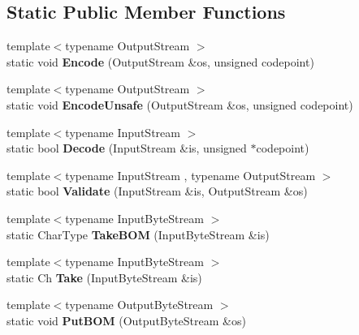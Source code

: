 \subsection*{Static Public Member Functions}
\begin{DoxyCompactItemize}
\item 
{\footnotesize template$<$typename Output\+Stream $>$ }\\static void {\bfseries Encode} (Output\+Stream \&os, unsigned codepoint)\hypertarget{struct_a_s_c_i_i_af56b1605fe233c54693facc7de457f72}{}\label{struct_a_s_c_i_i_af56b1605fe233c54693facc7de457f72}

\item 
{\footnotesize template$<$typename Output\+Stream $>$ }\\static void {\bfseries Encode\+Unsafe} (Output\+Stream \&os, unsigned codepoint)\hypertarget{struct_a_s_c_i_i_afeb90d6f04771067b83b35a0f366af46}{}\label{struct_a_s_c_i_i_afeb90d6f04771067b83b35a0f366af46}

\item 
{\footnotesize template$<$typename Input\+Stream $>$ }\\static bool {\bfseries Decode} (Input\+Stream \&is, unsigned $\ast$codepoint)\hypertarget{struct_a_s_c_i_i_a44844bbfd0a4fc282993fd72f3f58eee}{}\label{struct_a_s_c_i_i_a44844bbfd0a4fc282993fd72f3f58eee}

\item 
{\footnotesize template$<$typename Input\+Stream , typename Output\+Stream $>$ }\\static bool {\bfseries Validate} (Input\+Stream \&is, Output\+Stream \&os)\hypertarget{struct_a_s_c_i_i_a398680588a09e6ce9b56e32195047c78}{}\label{struct_a_s_c_i_i_a398680588a09e6ce9b56e32195047c78}

\item 
{\footnotesize template$<$typename Input\+Byte\+Stream $>$ }\\static Char\+Type {\bfseries Take\+B\+OM} (Input\+Byte\+Stream \&is)\hypertarget{struct_a_s_c_i_i_aad78500eb98f45582a4df020e3fb2278}{}\label{struct_a_s_c_i_i_aad78500eb98f45582a4df020e3fb2278}

\item 
{\footnotesize template$<$typename Input\+Byte\+Stream $>$ }\\static Ch {\bfseries Take} (Input\+Byte\+Stream \&is)\hypertarget{struct_a_s_c_i_i_ab1b9fdf0a5c05658d62fded913d923a3}{}\label{struct_a_s_c_i_i_ab1b9fdf0a5c05658d62fded913d923a3}

\item 
{\footnotesize template$<$typename Output\+Byte\+Stream $>$ }\\static void {\bfseries Put\+B\+OM} (Output\+Byte\+Stream \&os)\hypertarget{struct_a_s_c_i_i_a3036dc1d604039c3224ca0a890ee0134}{}\label{struct_a_s_c_i_i_a3036dc1d604039c3224ca0a890ee0134}


\end{DoxyCompactItemize}
